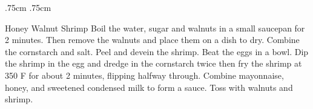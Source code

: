 \documentclass[]{article}
\title{}
\author{}
\begin{document}
\RecipeWidths{\textwidth}{3cm}{0.5cm}{5cm} {.75cm} {.75cm}
\begin{recipe}{Honey Walnut Shrimp}{}{}	
	Boil the water, sugar and walnuts in a small saucepan for 2 minutes. Then remove the walnuts and place them on a dish to dry. 
	Combine the cornstarch and salt. 
	Peel and devein the shrimp. Beat the eggs in a bowl. Dip the shrimp in the egg and dredge in the cornstarch twice then fry the shrimp at 350 \degree F for about 2 minutes, flipping halfway through.
	Combine mayonnaise, honey, and sweetened condensed milk to form a sauce. Toss with walnuts and shrimp. 
\end{recipe}
\end{document}
